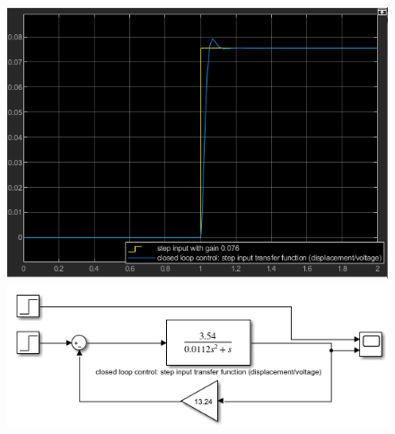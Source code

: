 \documentclass[conference]{IEEEtran}
\begin{document}
\begin{figure}[htbp]
    \centering
    \begin{minipage}[b]{0.24\textwidth}
        \includegraphics[width=\textwidth]{./Graph/G8.png}
        \caption{}
        \label{StepInputClosedLoopTR}
    \end{minipage}
    \hfill
    \begin{minipage}[b]{0.24\textwidth}
        \centering
        \includegraphics[width=\textwidth]{./Graph/G8'.png}
        \caption{}
    \end{minipage}
\end{figure}
\end{document}
